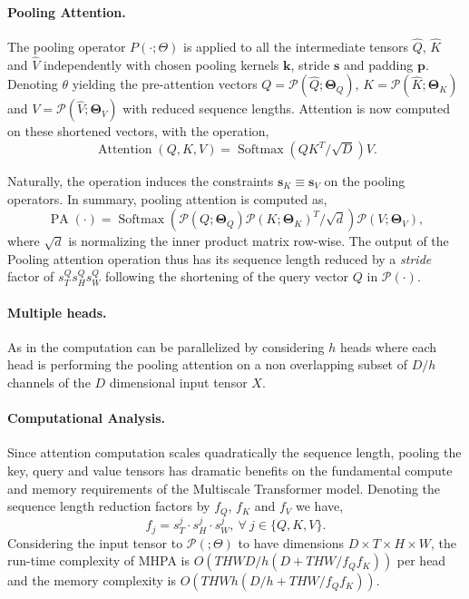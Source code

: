 \documentclass[10pt,twocolumn,letterpaper]{article}
\newcommand{\fullnameCC}{Multiscale Transformer\xspace}
\newcommand{\singleattnname}{pooling attention\xspace}
\newcommand{\attnabbv}{MHPA\xspace}
\begin{document}
\paragraph{Pooling Attention.}
 The pooling operator $P(\cdot; \Theta)$ is applied to all the intermediate tensors $\hat{Q}$, $\hat{K}$ and $\hat{V}$ independently with chosen pooling kernels $\mathbf{k}$, stride $\mathbf{s}$ and padding $\mathbf{p}$. Denoting $\theta$ yielding the pre-attention vectors $Q = \mathcal{P}(\hat{Q}; {\mathbf{\Theta}_Q})$, $K = \mathcal{P}(\hat{K}; {\mathbf{\Theta}_K})$ and $V = \mathcal{P}(\hat{V}; {\mathbf{\Theta}_V})$ with reduced sequence lengths. Attention is now computed on these shortened vectors, with the operation,
$$
\operatorname{Attention}(Q, K, V) = \operatorname{Softmax}(QK^T/\sqrt{D})V.
$$

Naturally, the operation induces the constraints $\mathbf{s}_K \equiv \mathbf{s}_V$ on the pooling operators. In summary, \singleattnname is computed as, 
$$
\operatorname{PA}(\cdot) = \operatorname{Softmax}(\mathcal{P}(Q; \mathbf{\Theta}_Q)\mathcal{P}(K; \mathbf{\Theta}_K)^T/\sqrt{d})\mathcal{P}(V; \mathbf{\Theta}_V),
$$
where $\sqrt{d}$ is normalizing the inner product matrix row-wise. The output of the Pooling attention operation thus has its sequence length reduced by a \textit{stride} factor of $s^Q_{T}s^Q_{H}s^Q_{W}$ following the shortening of the query vector $Q$ in $\mathcal{P}(\cdot)$.

 \paragraph{Multiple heads.} As in  \cite{vaswani2017attention} the computation can be parallelized by considering $h$ heads where each head is performing the pooling attention on a non overlapping subset of $D/h$ channels of the $D$ dimensional input tensor $X$.
 
 \paragraph{Computational Analysis.}Since attention computation scales quadratically \wrt the sequence length, pooling the key, query and value tensors has dramatic benefits on the fundamental compute and memory requirements of the \fullnameCC model. Denoting the sequence length reduction factors by $f_Q$, $f_K$ and $f_V$ we have, 
 $$
f_j = s^j_T \cdot s^j_H \cdot s^j_W, \ \forall \ j \in \{Q,K,V\}.
$$
Considering the input tensor to $\mathcal{P}(; \Theta)$ to have dimensions $D \times T \times H \times W$, the run-time complexity of \attnabbv is $O(THW D/h (D+THW/f_Qf_K))$ per head and the memory complexity is $O(THWh(D/h + THW/f_Qf_K))$. 
\end{document}
